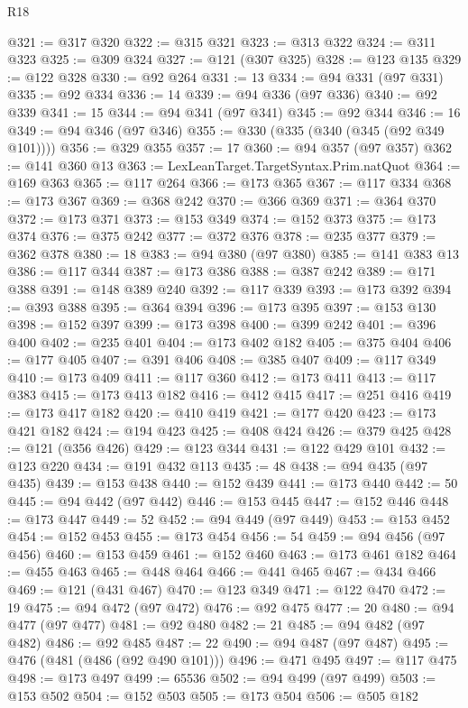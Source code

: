 \begin{lexlean}{R18}
\begin{coremodule}
@321 := @317 @320
@322 := @315 @321
@323 := @313 @322
@324 := @311 @323
@325 := @309 @324
@327 := @121 (@307 @325)
@328 := @123 @135
@329 := @122 @328
@330 := @92 @264
@331 := 13
@334 := @94 @331 (@97 @331)
@335 := @92 @334
@336 := 14
@339 := @94 @336 (@97 @336)
@340 := @92 @339
@341 := 15
@344 := @94 @341 (@97 @341)
@345 := @92 @344
@346 := 16
@349 := @94 @346 (@97 @346)
@355 := @330 (@335 (@340 (@345 (@92 @349 @101))))
@356 := @329 @355
@357 := 17
@360 := @94 @357 (@97 @357)
@362 := @141 @360 @13
@363 := LexLeanTarget.TargetSyntax.Prim.natQuot
@364 := @169 @363
@365 := @117 @264
@366 := @173 @365
@367 := @117 @334
@368 := @173 @367
@369 := @368 @242
@370 := @366 @369
@371 := @364 @370
@372 := @173 @371
@373 := @153 @349
@374 := @152 @373
@375 := @173 @374
@376 := @375 @242
@377 := @372 @376
@378 := @235 @377
@379 := @362 @378
@380 := 18
@383 := @94 @380 (@97 @380)
@385 := @141 @383 @13
@386 := @117 @344
@387 := @173 @386
@388 := @387 @242
@389 := @171 @388
@391 := @148 @389 @240
@392 := @117 @339
@393 := @173 @392
@394 := @393 @388
@395 := @364 @394
@396 := @173 @395
@397 := @153 @130
@398 := @152 @397
@399 := @173 @398
@400 := @399 @242
@401 := @396 @400
@402 := @235 @401
@404 := @173 @402 @182
@405 := @375 @404
@406 := @177 @405
@407 := @391 @406
@408 := @385 @407
@409 := @117 @349
@410 := @173 @409
@411 := @117 @360
@412 := @173 @411
@413 := @117 @383
@415 := @173 @413 @182
@416 := @412 @415
@417 := @251 @416
@419 := @173 @417 @182
@420 := @410 @419
@421 := @177 @420
@423 := @173 @421 @182
@424 := @194 @423
@425 := @408 @424
@426 := @379 @425
@428 := @121 (@356 @426)
@429 := @123 @344
@431 := @122 @429 @101
@432 := @123 @220
@434 := @191 @432 @113
@435 := 48
@438 := @94 @435 (@97 @435)
@439 := @153 @438
@440 := @152 @439
@441 := @173 @440
@442 := 50
@445 := @94 @442 (@97 @442)
@446 := @153 @445
@447 := @152 @446
@448 := @173 @447
@449 := 52
@452 := @94 @449 (@97 @449)
@453 := @153 @452
@454 := @152 @453
@455 := @173 @454
@456 := 54
@459 := @94 @456 (@97 @456)
@460 := @153 @459
@461 := @152 @460
@463 := @173 @461 @182
@464 := @455 @463
@465 := @448 @464
@466 := @441 @465
@467 := @434 @466
@469 := @121 (@431 @467)
@470 := @123 @349
@471 := @122 @470
@472 := 19
@475 := @94 @472 (@97 @472)
@476 := @92 @475
@477 := 20
@480 := @94 @477 (@97 @477)
@481 := @92 @480
@482 := 21
@485 := @94 @482 (@97 @482)
@486 := @92 @485
@487 := 22
@490 := @94 @487 (@97 @487)
@495 := @476 (@481 (@486 (@92 @490 @101)))
@496 := @471 @495
@497 := @117 @475
@498 := @173 @497
@499 := 65536
@502 := @94 @499 (@97 @499)
@503 := @153 @502
@504 := @152 @503
@505 := @173 @504
@506 := @505 @182

\end{coremodule}
\end{lexlean}
